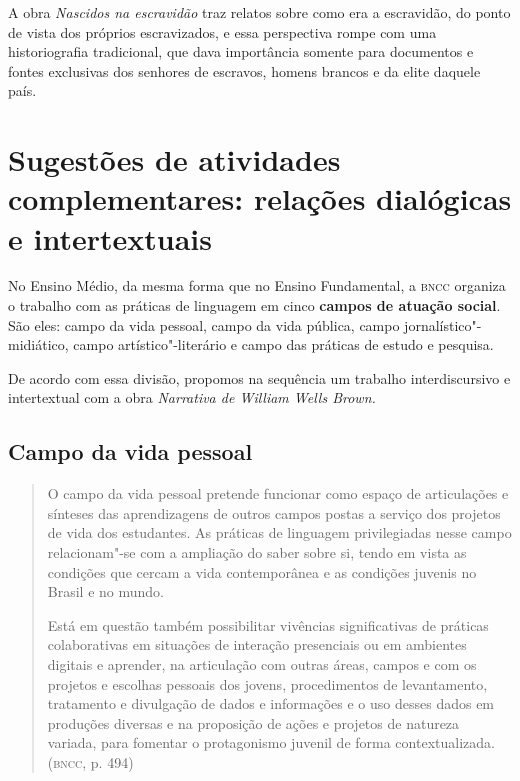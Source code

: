 \documentclass[11pt]{extarticle}
\begin{document}
A obra \emph{Nascidos na escravidão} traz relatos sobre como era a
escravidão, do ponto de vista dos próprios escravizados, e essa
perspectiva rompe com uma historiografia tradicional, que dava
importância somente para documentos e fontes exclusivas dos senhores de
escravos, homens brancos e da elite daquele país.


\section{Sugestões de atividades complementares: relações dialógicas e intertextuais}



No Ensino Médio, da mesma forma que no Ensino Fundamental, a \textsc{bncc}
organiza o trabalho com as práticas de linguagem em cinco \textbf{campos
de atuação social}. São eles: campo da vida pessoal, campo da vida
pública, campo jornalístico"-midiático, campo artístico"-literário e campo
das práticas de estudo e pesquisa.

De acordo com essa divisão, propomos na sequência um trabalho
interdiscursivo e intertextual com a obra \emph{Narrativa de William
Wells Brown.}

\subsection{Campo da vida pessoal}

\begin{quote}
O campo da vida pessoal pretende funcionar como espaço de articulações
e sínteses das aprendizagens de outros campos postas a serviço dos
projetos de vida dos estudantes. As práticas de linguagem privilegiadas
nesse campo relacionam"-se com a ampliação do saber sobre si, tendo em
vista as condições que cercam a vida contemporânea e as condições
juvenis no Brasil e no mundo.

Está em questão também possibilitar vivências significativas de práticas
colaborativas em situações de interação presenciais ou em ambientes
digitais e aprender, na articulação com outras áreas, campos e com os
projetos e escolhas pessoais dos jovens, procedimentos de levantamento,
tratamento e divulgação de dados e informações e o uso desses dados em
produções diversas e na proposição de ações e projetos de natureza
variada, para fomentar o protagonismo juvenil de forma
contextualizada. (\textsc{bncc}, p. 494)
\end{quote}
\end{document}
